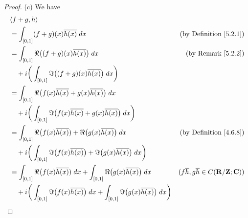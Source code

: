 \begin{proof}{(c)}
    We have
    \begin{align*}
         & \inner*{f + g, h}                                                                                                                                                                                                  \\
         & = \int_{[0, 1]} (f + g)(x) \overline{h(x)} \; dx                                                                                    & \text{(by Definition \ref{5.2.1})}                                           \\
         & = \int_{[0, 1]} \Re\big((f + g)(x) \overline{h(x)}\big) \; dx                                                                       & \text{(by Remark \ref{5.2.2})}                                               \\
         & \quad + i \bigg(\int_{[0, 1]} \Im\big((f + g)(x) \overline{h(x)}\big) \; dx\bigg)                                                                                                                                  \\
         & = \int_{[0, 1]} \Re\big(f(x) \overline{h(x)} + g(x) \overline{h(x)}\big) \; dx                                                                                                                                     \\
         & \quad + i \bigg(\int_{[0, 1]} \Im\big(f(x) \overline{h(x)} + g(x) \overline{h(x)}\big) \; dx\bigg)                                                                                                                 \\
         & = \int_{[0, 1]} \Re\big(f(x) \overline{h(x)}) + \Re\big(g(x) \overline{h(x)}\big) \; dx                                             & \text{(by Definition \ref{4.6.8})}                                           \\
         & \quad + i \bigg(\int_{[0, 1]} \Im\big(f(x) \overline{h(x)}\big) + \Im\big(g(x) \overline{h(x)}\big) \; dx\bigg)                                                                                                    \\
         & = \int_{[0, 1]} \Re\big(f(x) \overline{h(x)}) \; dx + \int_{[0, 1]} \Re\big(g(x) \overline{h(x)}\big) \; dx                         & (f \overline{h}, g \overline{h} \in C(\mathbf{R} / \mathbf{Z} ; \mathbf{C})) \\
         & \quad + i \bigg(\int_{[0, 1]} \Im\big(f(x) \overline{h(x)}\big) \; dx + \int_{[0, 1]} \Im\big(g(x) \overline{h(x)}\big) \; dx\bigg)                                                                                \\

\end{align*}
\end{proof}
